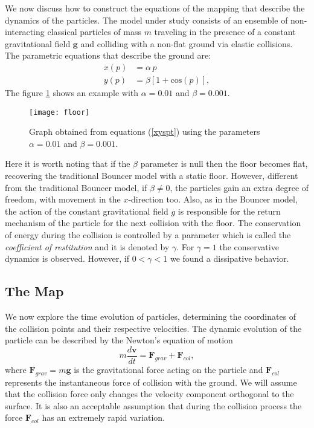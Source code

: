 \documentclass[reprint, aps, pre,nofootinbib]{revtex4-1}
\begin{document}
We now discuss how to construct the equations of the mapping that
describe the dynamics of the particles. The model under study consists
of an ensemble of non-interacting classical particles of mass $m$
traveling in the presence of a constant gravitational field $\boldsymbol{g}$
and colliding with a non-flat ground via elastic collisions. The parametric
equations that describe the ground are: 
\begin{equation}
\begin{split}x(p) & =\alpha\,p\\
y(p) & =\beta\left[1+\textrm{cos}\left(p\right)\right],
\end{split}
\label{xyspt}
\end{equation}
The figure \ref{FigFloor} shows an example with $\alpha=0.01$ and
$\beta=0.001$.
\begin{figure}[H]
\centering{}\texttt{[image: floor]}\caption{Graph obtained from equations (\ref{xyspt}) using the parameters
$\alpha=0.01$ and $\beta=0.001$.}
\label{FigFloor}
\end{figure}
Here it is worth noting that if the $\beta$ parameter is null then
the floor becomes flat, recovering the traditional Bouncer model \citep{Livorati}
with a static floor. However, different from the traditional Bouncer
model, if $\beta\neq0$, the particles gain an extra degree of freedom,
with movement in the $x$-direction too. Also, as in the Bouncer model,
the action of the constant gravitational field $g$ is responsible
for the return mechanism of the particle for the next collision with
the floor. The conservation of energy during the collision is controlled
by a parameter which is called the \textit{coefficient of restitution}
and it is denoted by $\gamma$. For $\gamma=1$ the conservative dynamics
is observed. However, if $0<\gamma<1$ we found a dissipative behavior.

\subsection{The Map}

We now explore the time evolution of particles, determining the coordinates
of the collision points and their respective velocities. The dynamic
evolution of the particle can be described by the Newton's equation
of motion
\begin{equation}
m\frac{d\boldsymbol{v}}{dt}=\boldsymbol{F}_{grav}+\boldsymbol{F}_{col},\label{Newton1}
\end{equation}
where $\boldsymbol{F}_{grav}=m\boldsymbol{g}$ is the gravitational
force acting on the particle and $\boldsymbol{F}_{col}$ represents
the instantaneous force of collision with the ground. We will assume
that the collision force only changes the velocity component orthogonal
to the surface. It is also an acceptable assumption that during the
collision process the force $\boldsymbol{F}_{col}$ has an extremely
rapid variation. 
\end{document}
